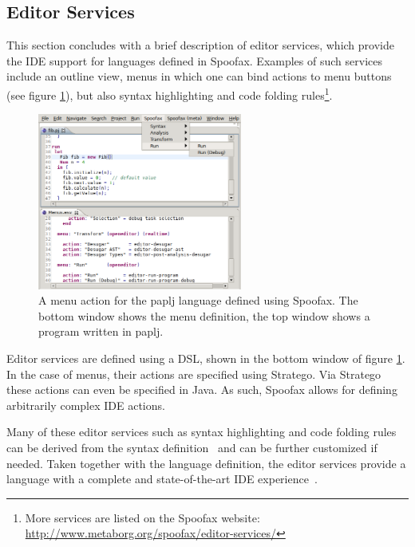 \subsection{Editor Services}
\label{sec:editor-serv}
This section concludes with a brief description of editor services,
which provide the IDE support for languages defined in
Spoofax. Examples of such services include an outline view, menus in
which one can bind actions to menu buttons (see figure
\ref{fig:menu-actions}), but also syntax highlighting and code folding
rules\footnote{More services are listed on the Spoofax
website: \url{http://www.metaborg.org/spoofax/editor-services/}}.

\begin{figure}[htb]
\centering
\includegraphics[width=0.6\textwidth]{./img/menu-actions.png}
\caption{\label{fig:menu-actions}
A menu action for the paplj language defined using Spoofax. The bottom window shows the menu definition, the top window shows a program written in paplj.}
\end{figure}

Editor services are defined using a DSL, shown in the bottom window of
figure \ref{fig:menu-actions}. In the case of menus, their actions are
specified using Stratego. Via Stratego these actions can even be
specified in Java. As such, Spoofax allows for defining arbitrarily
complex IDE actions.

Many of these editor services such as syntax highlighting and code
folding rules can be derived from the syntax
definition~\cite{Kats10c} and can be further customized if
needed. Taken together with the language definition, the editor
services provide a language with a complete and state-of-the-art IDE
experience~\cite{Kats10a}.
